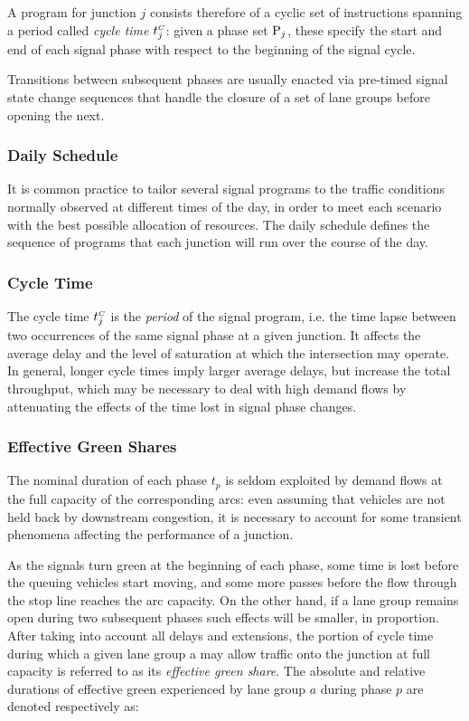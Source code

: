 A program for junction $j$ consists therefore of a cyclic set of instructions spanning a period called \emph{cycle time} $t_{j}^{\scriptscriptstyle{C}}$: given a phase set $\mathrm{P}_j$, these specify the start and end of each signal phase with respect to the beginning of the signal cycle.

Transitions between subsequent phases are usually enacted via pre-timed signal state change sequences that handle the closure of a set of lane groups before opening the next.

\subsubsection{Daily Schedule}
It is common practice to tailor several signal programs to the traffic conditions normally
observed at different times of the day, in order to meet each scenario with the best possible
allocation of resources. The daily schedule defines the sequence of programs that each
junction will run over the course of the day.

\subsubsection{Cycle Time}
The cycle time $t_{j}^{\scriptscriptstyle{C}}$ is the \emph{period} of the signal program, i.e. the time lapse between two occurrences of the same signal phase at a given junction.
It affects the average delay and the level of saturation at which the intersection may operate. In general, longer cycle times imply larger average delays, but increase the total throughput, which may be necessary to deal with high demand flows by attenuating the effects of the time lost in signal phase changes.

\subsubsection{Effective Green Shares}
The nominal duration of each phase $t_p$ is seldom exploited by demand flows at the full
capacity of the corresponding arcs: even assuming that vehicles are not held back by
downstream congestion, it is necessary to account for some transient phenomena affecting the
performance of a junction.

As the signals turn green at the beginning of each phase, some time is lost before the
queuing vehicles start moving, and some more passes before the flow through the stop line reaches the arc capacity.
On the other hand, if a lane group remains open during two subsequent phases such effects will be smaller, in proportion.
After taking into account all delays and extensions, the portion of cycle time during
which a given lane group a may allow traffic onto the junction at full capacity is referred to as
its \emph{effective green share}.
The absolute and relative durations of effective green experienced by lane group $a$ during phase $p$ are denoted respectively as:

